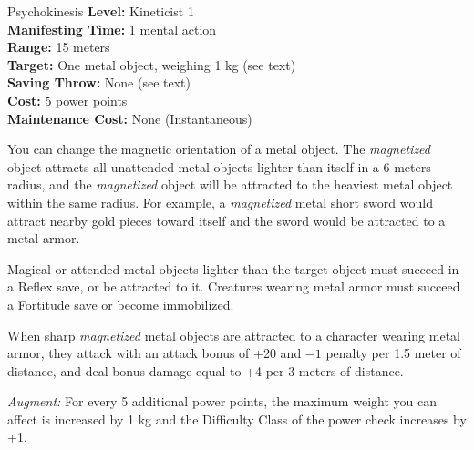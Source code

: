 {Psychokinesis}
{
	\textbf{Level:}
	Kineticist 1\\
	\textbf{Manifesting Time:}
	1 mental action\\
	\textbf{Range:}
	15 meters\\
	\textbf{Target:}
	One metal object, weighing 1 kg (see text)\\
	\textbf{Saving Throw:}
	None (see text)\\
	\textbf{Cost:}
	5 power points\\
	\textbf{Maintenance Cost:}
	None (Instantaneous)\\
}
{
	You can change the magnetic orientation of a metal object. The \emph{magnetized} object attracts all unattended metal objects lighter than itself in a 6 meters radius, and the \emph{magnetized} object will be attracted to the heaviest metal object within the same radius. For example, a \emph{magnetized} metal short sword would attract nearby gold pieces toward itself and the sword would be attracted to a metal armor.

	Magical or attended metal objects lighter than the target object must succeed in a Reflex save, or be attracted to it. Creatures wearing metal armor must succeed a Fortitude save or become immobilized.

	When sharp \emph{magnetized} metal objects are attracted to a character wearing metal armor, they attack with an attack bonus of +20 and $-1$ penalty per 1.5 meter of distance, and deal bonus damage equal to +4 per 3 meters of distance.

	\textit{Augment:} For every 5 additional power points, the maximum weight you can affect is increased by 1 kg and the Difficulty Class of the power check increases by +1.
}